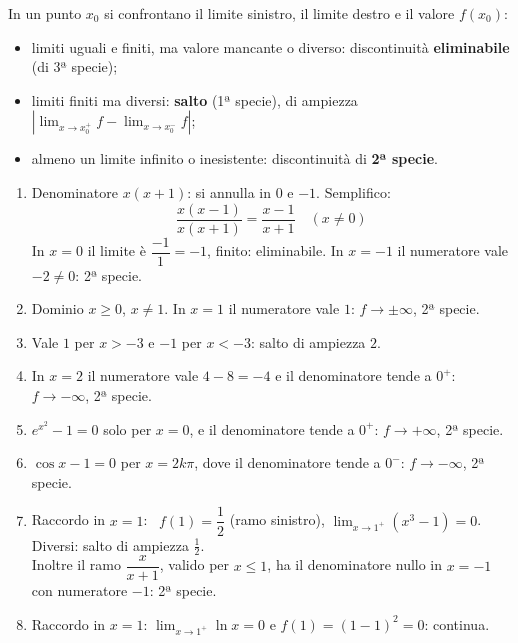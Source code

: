 \begin{question}[ID=2.3, subtitle={Punti singolari — serie 3}, tags={continuità, punti singolari}, difficulty=media]
\begin{explanation}
In un punto $x_0$ si confrontano il limite sinistro, il limite destro e il valore $f(x_0)$:
\begin{itemize}
    \item limiti uguali e finiti, ma valore mancante o diverso: discontinuità \textbf{eliminabile} (di 3ª specie);
    \item limiti finiti ma diversi: \textbf{salto} (1ª specie), di ampiezza $|\lim_{x\to x_0^+}f-\lim_{x\to x_0^-}f|$;
    \item almeno un limite infinito o inesistente: discontinuità di \textbf{2ª specie}.
\end{itemize}
\begin{enumerate}[label=\arabic*)]
    \item Denominatore $x(x+1)$: si annulla in $0$ e $-1$. Semplifico:
    \[ \dfrac{x(x-1)}{x(x+1)}=\dfrac{x-1}{x+1} \quad (x\neq0) \]
    In $x=0$ il limite è $\dfrac{-1}{1}=-1$, finito: eliminabile. In $x=-1$ il numeratore vale $-2\neq0$: 2ª specie.
    \item Dominio $x\geq0$, $x\neq1$. In $x=1$ il numeratore vale $1$: $f\to\pm\infty$, 2ª specie.
    \item Vale $1$ per $x>-3$ e $-1$ per $x<-3$: salto di ampiezza $2$.
    \item In $x=2$ il numeratore vale $4-8=-4$ e il denominatore tende a $0^+$: $f\to-\infty$, 2ª specie.
    \item $e^{x^2}-1=0$ solo per $x=0$, e il denominatore tende a $0^+$: $f\to+\infty$, 2ª specie.
    \item $\cos x-1=0$ per $x=2k\pi$, dove il denominatore tende a $0^-$: $f\to-\infty$, 2ª specie.
    \item Raccordo in $x=1$: \ $f(1)=\dfrac12$ (ramo sinistro), $\displaystyle\lim_{x\to1^+}(x^3-1)=0$. Diversi: salto di ampiezza $\tfrac12$. \\
    Inoltre il ramo $\dfrac{x}{x+1}$, valido per $x\leq1$, ha il denominatore nullo in $x=-1$ con numeratore $-1$: 2ª specie.
    \item Raccordo in $x=1$: $\displaystyle\lim_{x\to1^+}\ln x=0$ e $f(1)=(1-1)^2=0$: continua.
\end{enumerate}
\end{explanation}
\end{question}



